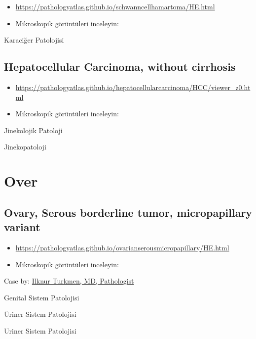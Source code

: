 \documentclass[
  letterpaper,
  DIV=11,
  numbers=noendperiod]{scrreprt}
\begin{document}
\begin{itemize}
\item
  \url{https://pathologyatlas.github.io/schwanncellhamartoma/HE.html}
\item
  Mikroskopik görüntüleri inceleyin:
\end{itemize}

Karaciğer Patolojisi

\hypertarget{hepatocellular-carcinoma-without-cirrhosis}{%
\section{Hepatocellular Carcinoma, without
cirrhosis}\label{hepatocellular-carcinoma-without-cirrhosis}}

\begin{itemize}
\item
  \url{https://pathologyatlas.github.io/hepatocellularcarcinoma/HCC/viewer_z0.html}
\item
  Mikroskopik görüntüleri inceleyin:
\end{itemize}

Jinekolojik Patoloji

Jinekopatoloji

\hypertarget{over}{%
\chapter{Over}\label{over}}

\hypertarget{ovary-serous-borderline-tumor-micropapillary-variant}{%
\section{Ovary, Serous borderline tumor, micropapillary
variant}\label{ovary-serous-borderline-tumor-micropapillary-variant}}

\begin{itemize}
\item
  \url{https://pathologyatlas.github.io/ovarianserousmicropapillary/HE.html}
\item
  Mikroskopik görüntüleri inceleyin:
\end{itemize}

Case by:
\href{https://www.memorial.com.tr/en/doctors/ilknur-turkmen-1975}{Ilknur
Turkmen, MD, Pathologist}

Genital Sistem Patolojisi

Üriner Sistem Patolojisi

Uriner Sistem Patolojisi
\end{document}
